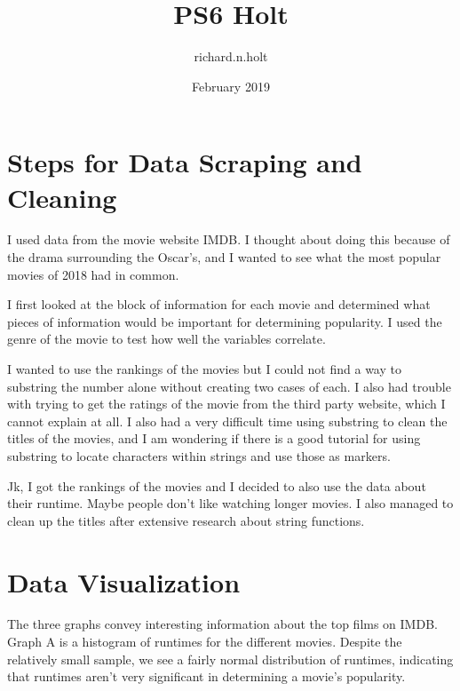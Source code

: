 \documentclass{article}
\title{PS6 Holt}
\author{richard.n.holt}
\date{February 2019}
\begin{document}
\maketitle

\section{Steps for Data Scraping and Cleaning}
I used data from the movie website IMDB. I thought about doing this because of the drama surrounding the Oscar's, and I wanted to see what the most popular movies of 2018 had in common.

I first looked at the block of information for each movie and determined what pieces of information would be important for determining popularity. I used the genre of the movie to test how well the variables correlate.

I wanted to use the rankings of the movies but I could not find a way to substring the number alone without creating two cases of each. I also had trouble with trying to get the ratings of the movie from the third party website, which I cannot explain at all. I also had a very difficult time using substring to clean the titles of the movies, and I am wondering if there is a good tutorial for using substring to locate characters within strings and use those as markers.

Jk, I got the rankings of the movies and I decided to also use the data about their runtime. Maybe people don't like watching longer movies. I also managed to clean up the titles after extensive research about string functions.

\section{Data Visualization}

The three graphs convey interesting information about the top films on IMDB. Graph A is a histogram of runtimes for the different movies. Despite the relatively small sample, we see a fairly normal distribution of runtimes, indicating that runtimes aren't very significant in determining a movie's popularity.
\end{document}
